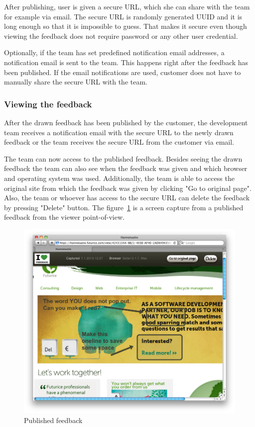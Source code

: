 \documentclass[english,12pt,a4paper,pdftex]{article}
\begin{document}
After publishing, user is given a secure \ac{URL}, which she can share with the team for example via email. The secure \ac{URL} is randomly generated \ac{UUID} and it is long enough so that it is impossible to guess. That makes it secure even though viewing the feedback does not require password or any other user credential.

Optionally, if the team has set predefined notification email addresses, a notification email is sent to the team. This happens right after the feedback has been published. If the email notifications are used, customer does not have to manually share the secure \ac{URL} with the team.

\subsubsection{Viewing the feedback}

After the drawn feedback has been published by the customer, the development team receives a notification email with the secure \ac{URL} to the newly drawn feedback or the team receives the secure \ac{URL} from the customer via email.

The team can now access to the published feedback. Besides seeing the drawn feedback the team can also see when the feedback was given and which browser and operating system was used. Additionally, the team is able to access the original site from which the feedback was given by clicking "Go to original page". Also, the team or whoever has access to the secure \ac{URL} can delete the feedback by pressing "Delete" button. The figure~\ref{fig:published_feedback} is a screen capture from a published feedback from the viewer point-of-view.

\begin{figure}[htb]
\begin{center}
\includegraphics[width=1.0\textwidth]{published_feedback.png}
\end{center}
\caption{Published feedback}
\label{fig:published_feedback}
\end{figure}
\end{document}
